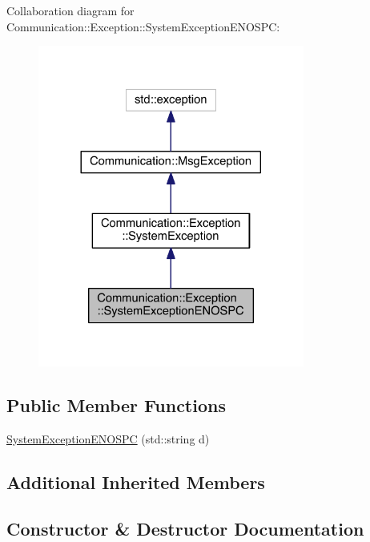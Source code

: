 Collaboration diagram for Communication\+:\+:Exception\+:\+:System\+Exception\+E\+N\+O\+S\+P\+C\+:\nopagebreak
\begin{figure}[H]
\begin{center}
\leavevmode
\includegraphics[width=248pt]{class_communication_1_1_exception_1_1_system_exception_e_n_o_s_p_c__coll__graph}
\end{center}
\end{figure}
\subsection*{Public Member Functions}
\begin{DoxyCompactItemize}
\item 
\hyperlink{class_communication_1_1_exception_1_1_system_exception_e_n_o_s_p_c_a7328e35dd6920c2b7b9c0acf13df100d}{System\+Exception\+E\+N\+O\+S\+P\+C} (std\+::string d)
\end{DoxyCompactItemize}
\subsection*{Additional Inherited Members}


\subsection{Constructor \& Destructor Documentation}
\hypertarget{class_communication_1_1_exception_1_1_system_exception_e_n_o_s_p_c_a7328e35dd6920c2b7b9c0acf13df100d}{}
